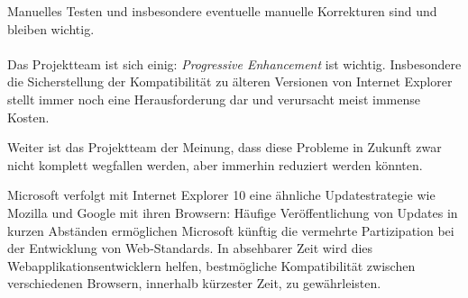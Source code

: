 Manuelles Testen und insbesondere eventuelle manuelle Korrekturen sind und bleiben wichtig.
\\ \\
Das Projektteam ist sich einig: \emph{Progressive Enhancement} ist wichtig. Insbesondere die Sicherstellung der Kompatibilität zu älteren Versionen von Internet Explorer stellt immer noch eine Herausforderung dar und verursacht meist immense Kosten.

Weiter ist das Projektteam der Meinung, dass diese Probleme in Zukunft zwar nicht komplett wegfallen werden, aber immerhin reduziert werden könnten.

Microsoft verfolgt mit Internet Explorer 10 eine ähnliche Updatestrategie wie Mozilla und Google mit ihren Browsern: Häufige Veröffentlichung von Updates in kurzen Abständen \cite{MicrosoftQuickensIEReleaseCycle} ermöglichen Microsoft künftig die vermehrte Partizipation bei der Entwicklung von Web-Standards. In absehbarer Zeit wird dies Webapplikationsentwicklern helfen, bestmögliche Kompatibilität zwischen verschiedenen Browsern, innerhalb kürzester Zeit, zu gewährleisten.